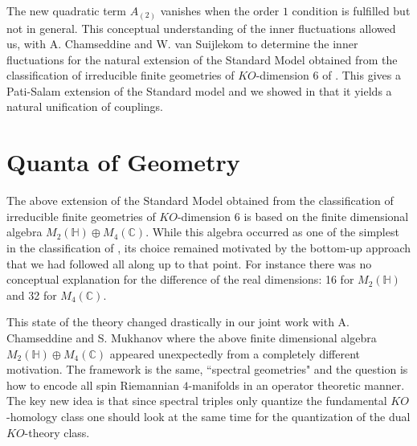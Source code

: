 \documentclass[12pt]{article}
\def\C{{\mathbb C}}
\def\H{{\mathbb H}}
\def\H{{\mathbb H}}
\begin{document}
The new quadratic term $A_{\left(  2\right)  }$ vanishes when the order $1$ condition is fulfilled but not in general. This conceptual understanding of the inner fluctuations allowed us, with A. Chamseddine and W. van Suijlekom \cite{acinner, acpati1,acpati2} to determine the inner fluctuations for the natural extension of the Standard Model obtained from the classification of irreducible finite geometries of $KO$-dimension $6$ of \cite{cc5,cc6}. This gives a Pati-Salam extension of the Standard model and we showed in \cite{acpati1,acpati2} that it yields  a natural unification of couplings. 
 


 
 
\section{Quanta of Geometry}\label{higherheis}
The above extension of the Standard Model obtained from the classification of irreducible finite geometries of $KO$-dimension $6$ is based on the  finite dimensional algebra $M_2(\H)\oplus M_4(\C)$. While this algebra occurred as one of the simplest in the classification of \cite{cc5,cc6}, its choice remained motivated by the bottom-up approach that we had followed all along up to that point. For instance there was no conceptual explanation for the difference of the real dimensions: 16 for $M_2(\H)$ and 32 for $M_4(\C)$. 

This state of the theory changed drastically in our joint work with A. Chamseddine and S. Mukhanov  \cite{acmu1,acmu2} where the above  finite dimensional algebra $M_2(\H)\oplus M_4(\C)$ appeared unexpectedly from a completely different motivation. The framework is the same, ``spectral geometries" and the question is how to encode all spin Riemannian  $4$-manifolds  in an operator theoretic manner. The key new idea is that since spectral triples only quantize the fundamental $KO$-homology class one should look at the same time for the quantization of the dual $KO$-theory class.
\end{document}
